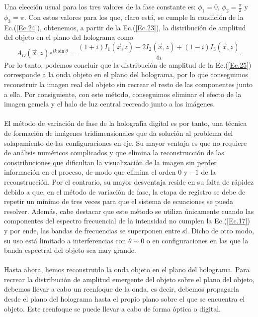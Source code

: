 \documentclass[12pt]{article}
\begin{document}
Una elección usual para los tres valores de la fase constante es: $\phi_1 = 0$,  $\phi_2 = \frac{\pi}{2}$ y  $\phi_3 = \pi$. Con estos valores para los que, claro está, se cumple la condición de la Ec.(\ref{Ec.24}), obtenemos, a partir de la Ec.(\ref{Ec.23}), la distribución de amplitud del objeto en el plano del holograma como
\begin{equation}
   A_O (\vec{x}, z)e^{i k \sin{\theta}} = \frac{(1+i) I_1 (\Vec{x},z) - 2 I_2 (\Vec{x},z) + (1-i) I_3(\Vec{x},z)}{4i}.
    \label{Ec.25}
\end{equation}
Por lo tanto, podemos concluir que la distribución de amplitud de la Ec.(\ref{Ec.25}) corresponde a la onda objeto en el plano del holograma, por lo que conseguimos reconstruir  la imagen real del objeto sin recrear el resto de las componentes junto a ella. Por consiguiente, con este método, conseguimos eliminar  el efecto de la imagen gemela  y el halo de luz central recreado junto a las imágenes. \\ \\
El método de variación de fase de la holografía digital es  por tanto, una técnica  de formación de imágenes tridimensionales que  da solución al problema del solapamiento de las configuraciones en eje.  Su mayor ventaja es que no requiere de análisis numéricos complicados y que elimina la reconstrucción de las constribuciones que dificultan la visualización de la imagen  sin perder información en el proceso, de modo  que elimina el orden  $0$ y $-1$ de la reconstrucción. Por el contrario, su mayor desventaja reside en su falta de rápidez debido a que, en el método de variación de fase, la etapa de registro se debe de repetir un mínimo de tres veces para que el sistema de ecuaciones se pueda resolver. Además, cabe destacar que este método se utiliza únicamente cuando las componentes del espectro frecuencial de la intensidad no cumplen la Ec.(\ref{Ec.17}) y por ende, las bandas de frecuencias se superponen entre sí. Dicho de otro modo, su uso está limitado a interferencias con   $\theta \sim 0$ o en configuraciones en las que la  banda espectral del objeto sea muy grande.\\ \\
Hasta ahora, hemos reconstruido la onda objeto en el plano del holograma. Para recrear la distribución de amplitud emergente del objeto sobre el plano del objeto, debemos llevar a cabo un reenfoque de la  onda, es decir, debemos propagarla desde el plano del holograma hasta el propio plano sobre el que se encuentra el objeto. Este reenfoque se puede llevar a cabo de forma óptica o digital.\\\\
\end{document}
